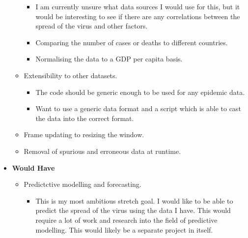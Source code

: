\documentclass{report}
\begin{document}
\begin{itemize}
\begin{itemize}
        \begin{itemize}
            \item I am currently unsure what data sources I would use for this, but it would be interesting to see if there are any correlations between the spread of the virus and other factors.
            \item Comparing the number of cases or deaths to different countries.
            \item Normalising the data to a GDP per capita basis.
        \end{itemize}
        \item Extensibility to other datasets.
        \begin{itemize}
            \item The code should be generic enough to be used for any epidemic data.
            \item Want to use a generic data format and a script which is able to cast the data into the correct format.
        \end{itemize}
        \item Frame updating to resizing the window.
        \item Removal of spurious and erroneous data at runtime.
    \end{itemize}
    \item \textbf{\Large{Would Have}}
    \begin{itemize}
        \item Predictctive modelling and forecasting.
        \begin{itemize}
            \item This is my most ambitious stretch goal. I would like to be able to predict the spread of the virus using the data I have. This would require a lot of work and research into the field of predictive modelling. This would likely be a separate project in itself.
        \end{itemize}
    \end{itemize}
\end{itemize}
\newpage
\end{document}
